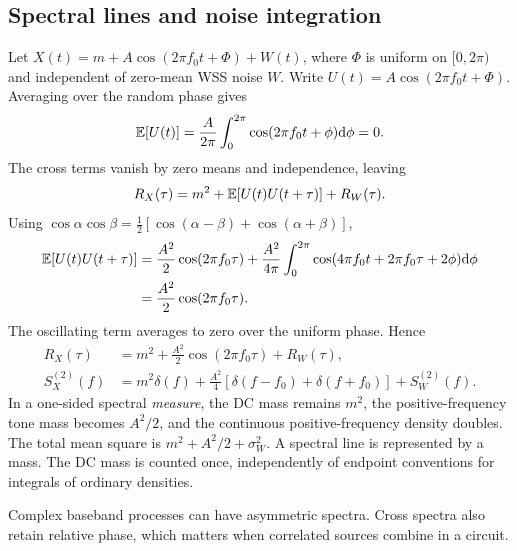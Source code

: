 \subsection{Spectral lines and noise integration}
\label{sec:spectral-lines}
\begin{example}[title={A constant mean, a tone, and broadband noise}]
Let $X(t)=m+A\cos(2\pi f_0t+\Phi)+W(t)$, where $\Phi$ is uniform on $[0,2\pi)$ and independent of zero-mean WSS noise $W$. Write $U(t)=A\cos(2\pi f_0t+\Phi)$. Averaging over the random phase gives
\[
\mathbb E[U(t)]=\frac{A}{2\pi}\int_0^{2\pi}\cos(2\pi f_0t+\phi)\mathrm d\phi=0.
\]
The cross terms vanish by zero means and independence, leaving
\[
R_X(\tau)=m^2+\mathbb E[U(t)U(t+\tau)]+R_W(\tau).
\]
Using $\cos\alpha\cos\beta=\tfrac12[\cos(\alpha-\beta)+\cos(\alpha+\beta)]$,
\begin{align*}
\mathbb E[U(t)U(t+\tau)]
&=\frac{A^2}{2}\cos(2\pi f_0\tau)
+\frac{A^2}{4\pi}\int_0^{2\pi}\cos(4\pi f_0t+2\pi f_0\tau+2\phi)\mathrm d\phi\\
&=\frac{A^2}{2}\cos(2\pi f_0\tau).
\end{align*}
The oscillating term averages to zero over the uniform phase. Hence
\begin{align*}
R_X(\tau)&=m^2+\frac{A^2}{2}\cos(2\pi f_0\tau)+R_W(\tau),\\
S_X^{(2)}(f)&=m^2\delta(f)+\frac{A^2}{4}[\delta(f-f_0)+\delta(f+f_0)]+S_W^{(2)}(f).
\end{align*}
In a one-sided spectral \emph{measure}, the DC mass remains $m^2$, the positive-frequency tone mass becomes $A^2/2$, and the continuous positive-frequency density doubles. The total mean square is $m^2+A^2/2+\sigma_W^2$. A spectral line is represented by a mass. The DC mass is counted once, independently of endpoint conventions for integrals of ordinary densities.
\end{example}
\SpectrumConventionFigure
Complex baseband processes can have asymmetric spectra. Cross spectra also retain relative phase, which matters when correlated sources combine in a circuit.

